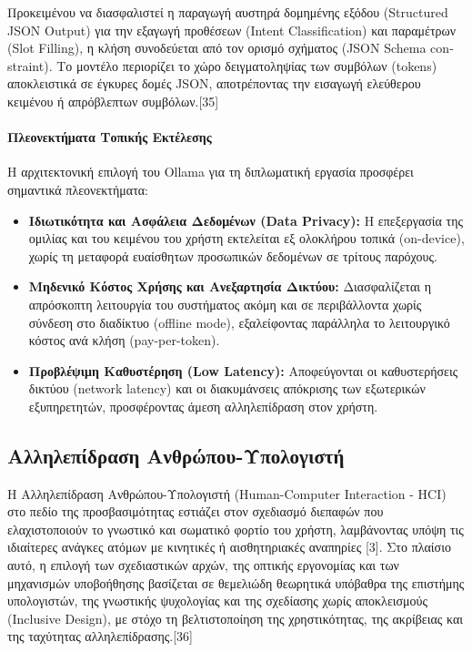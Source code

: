 \documentclass[twoside, a4paper, 11pt]{article}
\newcommand{\textlatin}[1]{\textenglish{#1}}
\begin{document}
Προκειμένου να διασφαλιστεί η παραγωγή αυστηρά δομημένης εξόδου (\textlatin{Structured JSON Output}) για την εξαγωγή προθέσεων (\textlatin{Intent Classification}) και παραμέτρων (\textlatin{Slot Filling}), η κλήση συνοδεύεται από τον ορισμό σχήματος (\textlatin{JSON Schema constraint}). Το μοντέλο περιορίζει το χώρο δειγματοληψίας των συμβόλων (\textlatin{tokens}) αποκλειστικά σε έγκυρες δομές \textlatin{JSON}, αποτρέποντας την εισαγωγή ελεύθερου κειμένου ή απρόβλεπτων συμβόλων.[35]

\paragraph{Πλεονεκτήματα Τοπικής Εκτέλεσης}
Η αρχιτεκτονική επιλογή του \textlatin{Ollama} για τη διπλωματική εργασία προσφέρει σημαντικά πλεονεκτήματα:
\begin{itemize}
    \item \textbf{Ιδιωτικότητα και Ασφάλεια Δεδομένων (\textlatin{Data Privacy}):} Η επεξεργασία της ομιλίας και του κειμένου του χρήστη εκτελείται εξ ολοκλήρου τοπικά (\textlatin{on-device}), χωρίς τη μεταφορά ευαίσθητων προσωπικών δεδομένων σε τρίτους παρόχους.
    \item \textbf{Μηδενικό Κόστος Χρήσης και Ανεξαρτησία Δικτύου:} Διασφαλίζεται η απρόσκοπτη λειτουργία του συστήματος ακόμη και σε περιβάλλοντα χωρίς σύνδεση στο διαδίκτυο (\textlatin{offline mode}), εξαλείφοντας παράλληλα το λειτουργικό κόστος ανά κλήση (\textlatin{pay-per-token}).
    \item \textbf{Προβλέψιμη Καθυστέρηση (\textlatin{Low Latency}):} Αποφεύγονται οι καθυστερήσεις δικτύου (\textlatin{network latency}) και οι διακυμάνσεις απόκρισης των εξωτερικών εξυπηρετητών, προσφέροντας άμεση αλληλεπίδραση στον χρήστη.
\end{itemize}

\subsection{Αλληλεπίδραση Ανθρώπου-Υπολογιστή}
Η Αλληλεπίδραση Ανθρώπου-Υπολογιστή (\textlatin{Human-Computer Interaction - HCI}) στο πεδίο της προσβασιμότητας εστιάζει στον σχεδιασμό διεπαφών που ελαχιστοποιούν το γνωστικό και σωματικό φορτίο του χρήστη, 
λαμβάνοντας υπόψη τις ιδιαίτερες ανάγκες ατόμων με κινητικές ή αισθητηριακές αναπηρίες [3]. Στο πλαίσιο αυτό, η επιλογή των σχεδιαστικών αρχών, της οπτικής εργονομίας και των μηχανισμών υποβοήθησης βασίζεται
σε θεμελιώδη θεωρητικά υπόβαθρα της επιστήμης υπολογιστών, της γνωστικής ψυχολογίας και της σχεδίασης χωρίς αποκλεισμούς (\textlatin{Inclusive Design}), με στόχο τη βελτιστοποίηση της χρηστικότητας, της ακρίβειας και της ταχύτητας αλληλεπίδρασης.[36]
\end{document}
